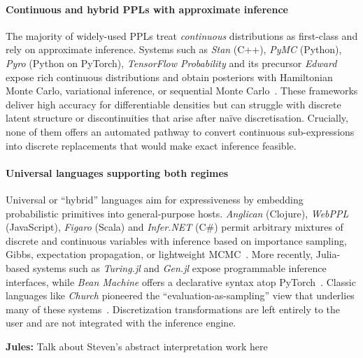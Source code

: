 \documentclass[acmsmall,screen,dvipsnames,x11names,nonacm,anonymous,review]{acmart}
\newcommand{\jules}[1]{{\color{blue}\textbf{Jules:} #1}}
\begin{document}
\paragraph{Continuous and hybrid PPLs with approximate inference}  
The majority of widely-used PPLs treat \emph{continuous} distributions as first-class and rely on approximate inference. Systems such as \emph{Stan} (C++), \emph{PyMC} (Python), \emph{Pyro} (Python on PyTorch), \emph{TensorFlow Probability} and its precursor \emph{Edward} expose rich continuous distributions and obtain posteriors with Hamiltonian Monte Carlo, variational inference, or sequential Monte Carlo~\cite{Carpenter2017Stan,Salvatier2016PyMC3,Bingham2019Pyro,Dillon2017TFP,Tran2016Edward}. These frameworks deliver high accuracy for differentiable densities but can struggle with discrete latent structure or discontinuities that arise after naïve discretisation. Crucially, none of them offers an automated pathway to convert continuous sub-expressions into discrete replacements that would make exact inference feasible.

\paragraph{Universal languages supporting both regimes}  
Universal or ``hybrid'' languages aim for expressiveness by embedding probabilistic primitives into general-purpose hosts. \emph{Anglican} (Clojure), \emph{WebPPL} (JavaScript), \emph{Figaro} (Scala) and \emph{Infer.NET} (C\#) permit arbitrary mixtures of discrete and continuous variables with inference based on importance sampling, Gibbs, expectation propagation, or lightweight MCMC~\cite{Tolpin2016Anglican,Goodman2014WebPPL,Pfeffer2009Figaro,Minka2018InferNET}. More recently, Julia-based systems such as \emph{Turing.jl} and \emph{Gen.jl} expose programmable inference interfaces, while \emph{Bean Machine} offers a declarative syntax atop PyTorch~\cite{Ge2018Turing,CusumanoTowner2019Gen,Tehrani2020BeanMachine}. Classic languages like \emph{Church} pioneered the ``evaluation-as-sampling'' view that underlies many of these systems~\cite{Goodman2008Church}. Discretization transformations are left entirely to the user and are not integrated with the inference engine.

\jules{Talk about Steven's abstract interpretation work here}
\end{document}
